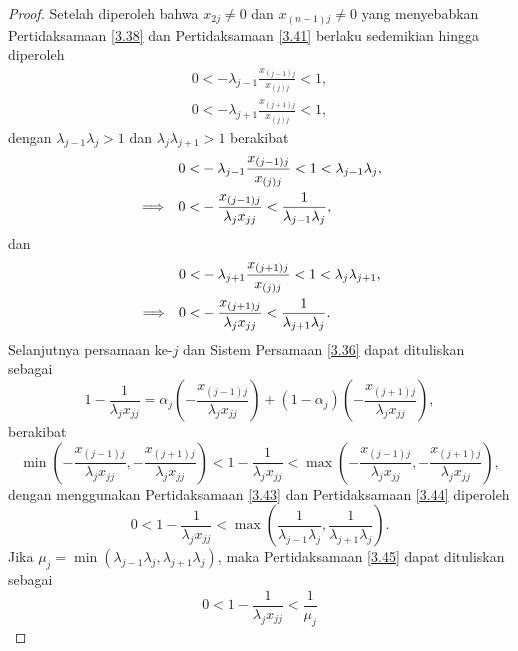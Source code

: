 \begin{proof}
    Setelah diperoleh bahwa $x_{2j} \neq 0$ dan $x_{(n-1)j} \neq 0$ yang menyebabkan Pertidaksamaan \eqref{3.38} dan Pertidaksamaan \eqref{3.41} berlaku sedemikian hingga diperoleh
    \begin{align*}
        0 < -\lambda_{j-1}\frac{x_{(j-1)j}}{x_{(j)j}} < 1,\\
        0 < -\lambda_{j+1}\frac{x_{(j+1)j}}{x_{(j)j}} < 1,
    \end{align*}
    dengan $\lambda_{j-1}\lambda_j>1$ dan $\lambda_{j}\lambda_{j+1}>1$ berakibat
    \begin{align}
        &&0 <& -\lambda_{j-1}\frac{x_{(j-1)j}}{x_{(j)j}} < 1 < \lambda_{j-1}\lambda_j, \notag \\
        &\Longrightarrow&0 <& -\frac{x_{(j-1)j}}{\lambda_{j}x_{jj}} < \frac{1}{\lambda_{j-1}\lambda_j}, \label{3.43}
    \end{align}
    dan
    \begin{align}
        &&0 <& -\lambda_{j+1}\frac{x_{(j+1)j}}{x_{(j)j}} < 1 < \lambda_{j}\lambda_{j+1}, \notag \\
        &\Longrightarrow&0 <& -\frac{x_{(j+1)j}}{\lambda_{j}x_{jj}} < \frac{1}{\lambda_{j+1}\lambda_j}. \label{3.44}
    \end{align}
    Selanjutnya persamaan ke-$j$ dan Sistem Persamaan \eqref{3.36} dapat dituliskan sebagai
    \begin{equation*}
        1 - \frac{1}{\lambda_j x_{jj}} = \alpha_j(-\frac{x_{(j-1)j}}{\lambda_{j}x_{jj}}) + (1 - \alpha_j)(-\frac{x_{(j+1)j}}{\lambda_{j}x_{jj}}),
    \end{equation*}
    berakibat
    \begin{equation*}
       \min(-\frac{x_{(j-1)j}}{\lambda_{j}x_{jj}},-\frac{x_{(j+1)j}}{\lambda_{j}x_{jj}}) < 1 - \frac{1}{\lambda_j x_{jj}} < \max(-\frac{x_{(j-1)j}}{\lambda_{j}x_{jj}},-\frac{x_{(j+1)j}}{\lambda_{j}x_{jj}}),
    \end{equation*}
    dengan menggunakan Pertidaksamaan \eqref{3.43} dan Pertidaksamaan \eqref{3.44} diperoleh
    \begin{equation}\label{3.45}
        0 < 1 - \frac{1}{\lambda_j x_{jj}} < \max(\frac{1}{\lambda_{j-1}\lambda_j},\frac{1}{\lambda_{j+1}\lambda_j}).
    \end{equation}
    Jika $\mu_j = \min(\lambda_{j-1}\lambda_j, \lambda_{j+1}\lambda_j)$, maka Pertidaksamaan \eqref{3.45} dapat dituliskan sebagai
    \begin{equation*}
        0 < 1 - \frac{1}{\lambda_j x_{jj}} < \frac{1}{\mu_j}
    \end{equation*}

\end{proof}

